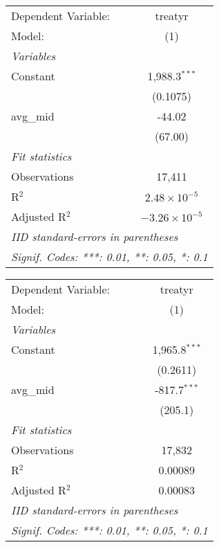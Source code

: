 \begingroup
\centering
\begin{tabular}{lc}
   \tabularnewline \midrule \midrule
   Dependent Variable: & treatyr\\  
   Model:              & (1)\\  
   \midrule
   \emph{Variables}\\
   Constant            & 1,988.3$^{***}$\\   
                       & (0.1075)\\   
   avg\_mid            & -44.02\\   
                       & (67.00)\\   
   \midrule
   \emph{Fit statistics}\\
   Observations        & 17,411\\  
   R$^2$               & $2.48\times 10^{-5}$\\   
   Adjusted R$^2$      & $-3.26\times 10^{-5}$\\   
   \midrule \midrule
   \multicolumn{2}{l}{\emph{IID standard-errors in parentheses}}\\
   \multicolumn{2}{l}{\emph{Signif. Codes: ***: 0.01, **: 0.05, *: 0.1}}\\
\end{tabular}
\par\endgroup



\begingroup
\centering
\begin{tabular}{lc}
   \tabularnewline \midrule \midrule
   Dependent Variable: & treatyr\\  
   Model:              & (1)\\  
   \midrule
   \emph{Variables}\\
   Constant            & 1,965.8$^{***}$\\   
                       & (0.2611)\\   
   avg\_mid            & -817.7$^{***}$\\   
                       & (205.1)\\   
   \midrule
   \emph{Fit statistics}\\
   Observations        & 17,832\\  
   R$^2$               & 0.00089\\  
   Adjusted R$^2$      & 0.00083\\  
   \midrule \midrule
   \multicolumn{2}{l}{\emph{IID standard-errors in parentheses}}\\
   \multicolumn{2}{l}{\emph{Signif. Codes: ***: 0.01, **: 0.05, *: 0.1}}\\
\end{tabular}
\par\endgroup



